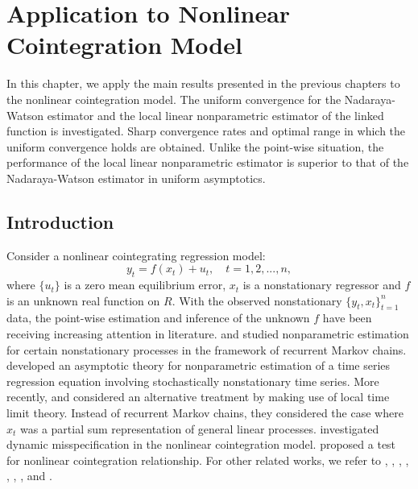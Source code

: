 \chapter{Application to Nonlinear Cointegration Model} 
\ifpdf
    \graphicspath{{Chapter4/Chapter4Figs/PNG/}{Chapter4/Chapter4Figs/PDF/}{Chapter4/Chapter4Figs/}}
\else
    \graphicspath{{Chapter4/Chapter4Figs/EPS/}{Chapter4/Chapter4Figs/}}
\fi

In this chapter, we apply the main results presented in the previous chapters to the nonlinear cointegration model. The uniform convergence for the Nadaraya-Watson estimator and the local linear nonparametric  estimator of the linked function is investigated. Sharp convergence rates and optimal range in which the uniform convergence holds are obtained. Unlike the point-wise situation, the performance of the local linear nonparametric  estimator is superior to that of the Nadaraya-Watson estimator in uniform asymptotics.


\section{Introduction}

Consider a nonlinear cointegrating regression model:
\begin{equation}
y_{t}=f(x_{t})+u_{t},\quad t=1,2,...,n,  \label{eqn:4:mo1}
\end{equation}%
where $\{u_{t}\}$ is a  zero mean  equilibrium error, $x_{t}$ is a
nonstationary  regressor and  $f$ is an unknown  real function on $R$. With the observed nonstationary $\{y_t, x_t\}_{t=1}^n$ data, the point-wise estimation  and
inference of the unknown $f$ have been receiving increasing attention in literature. \cite{karlsentjostheim2001} and \cite{guerre2004} studied
nonparametric estimation for certain nonstationary processes in the
framework of recurrent Markov chains. \cite{karlsenmyklebusttjostheim2007}
developed an asymptotic theory for nonparametric estimation of a
time series regression equation involving stochastically
nonstationary time series. More recently,  \citet[][\citeyear{wangphillips2009}, \citeyear{wangphillips2010b}]{wangphillips2010a} and \cite{cailipark2009} considered an alternative treatment by making use of local
time limit theory. Instead of recurrent Markov chains, they considered the case where
$x_t$ was a partial sum representation of general linear processes. \cite{kasparisphillips2012} investigated dynamic misspecification in the nonlinear cointegration model. \cite{choisaikkonen2010} proposed a test for nonlinear cointegration relationship. For other related works, we refer to \citet[][\citeyear{parkphillips2001}]{parkphillips1999}, \cite{bandi2004}, \citet[][\citeyear{gaomaxwelllutjostheim2009b}]{gaomaxwelllutjostheim2009a}, \cite{choisaikkonen2004},  \cite{marmer2008}, \cite{chengaoli2009}, \cite{wangphillips2012}, and \cite{wang2013}.

